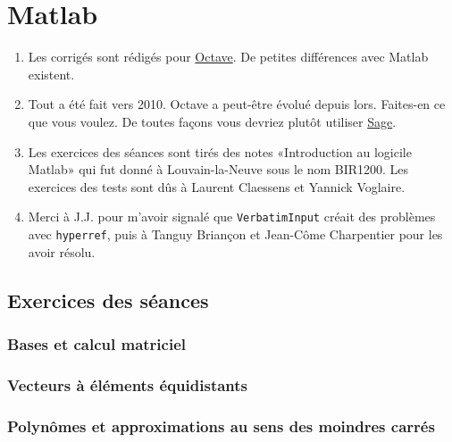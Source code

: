\chapter{Matlab}

\begin{enumerate}

	\item
	      Les corrigés sont rédigés pour \href{https://octave.org/}{Octave}. De petites différences avec Matlab existent.
	\item
	      Tout a été fait vers 2010. Octave a peut-être évolué depuis lors. Faites-en ce que vous voulez. De toutes façons vous devriez plutôt utiliser \href{https://www.sagemath.org/}{Sage}.
	\item
	      Les exercices des séances sont tirés des notes «Introduction au logicile Matlab» qui fut donné à Louvain-la-Neuve sous le nom BIR1200.  Les exercices des tests sont dûs à Laurent Claessens et Yannick Voglaire.
	\item
	      Merci à J.J. pour m'avoir signalé que \texttt{VerbatimInput} créait des problèmes avec \texttt{hyperref}, puis à Tanguy Briançon et Jean-Côme Charpentier pour les avoir résolu.
\end{enumerate}

\section{Exercices des séances}

\subsection{Bases et calcul matriciel}


\subsection{Vecteurs à éléments équidistants}


\subsection{Polynômes et approximations au sens des moindres carrés}



